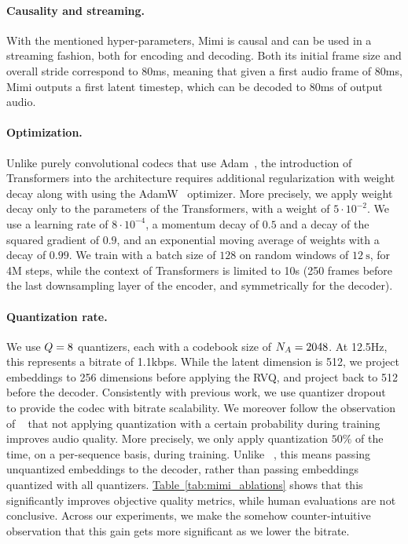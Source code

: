 \paragraph{Causality and streaming.} With the mentioned hyper-parameters, Mimi is causal and can be used in a streaming fashion, both for encoding and decoding. Both its initial frame size and overall stride correspond to 80ms, meaning that given a first audio frame of 80ms, Mimi outputs a first latent timestep, which can be decoded to 80ms of output audio.

\paragraph{Optimization.}
Unlike purely convolutional codecs that use Adam~\citep{adam}, the introduction of Transformers into the architecture requires additional regularization with weight decay along with using the AdamW~\citep{adamw} optimizer. More precisely, we apply weight decay only to the parameters of the Transformers, with a weight of $5\cdot 10^{-2}$. We use a learning rate of $8\cdot 10^{-4}$, a momentum decay of $0.5$ and a decay of the squared gradient of $0.9$, and an exponential moving average of weights with a decay of $0.99$. We train with a batch size of $128$ on random windows of $\SI{12}{\second}$, for 4M steps, while the context of Transformers is limited to 10s (250 frames before the last downsampling layer of the encoder, and symmetrically for the decoder).

\paragraph{Quantization rate.}
We use $\numquantizers= 8$ quantizers, each with a codebook size of $\cardaudio = 2048$. At 12.5Hz, this represents a bitrate of 1.1kbps. While the latent dimension is 512, we project embeddings to 256 dimensions before applying the RVQ, and project back to 512 before the decoder. Consistently with previous work, we use quantizer dropout~\citep{soundstream} to provide the codec with bitrate scalability. We moreover follow the observation of ~\citet{dac} that not applying quantization with a certain probability during training improves audio quality. More precisely, we only apply quantization $50\%$ of the time, on a per-sequence basis, during training. Unlike ~\citet{dac}, this means passing unquantized embeddings to the decoder, rather than passing embeddings quantized with all quantizers. \hyperref[tab:mimi_ablations]{Table~\ref{tab:mimi_ablations}} shows that this significantly improves objective quality metrics, while human evaluations are not conclusive. Across our experiments, we make the somehow counter-intuitive observation that this gain gets more significant as we lower the bitrate.

